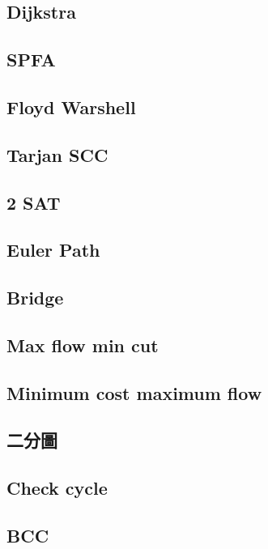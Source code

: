 \subsection{Dijkstra} 

\subsection{SPFA} 

\subsection{Floyd Warshell} 

\subsection{Tarjan SCC} 

\subsection{2 SAT} 

\subsection{Euler Path}

\subsection{Bridge} 

\subsection{Max flow min cut} 

\subsection{Minimum cost maximum flow} 

\subsection{二分圖} 

\subsection{Check cycle} 

\subsection{BCC} 



